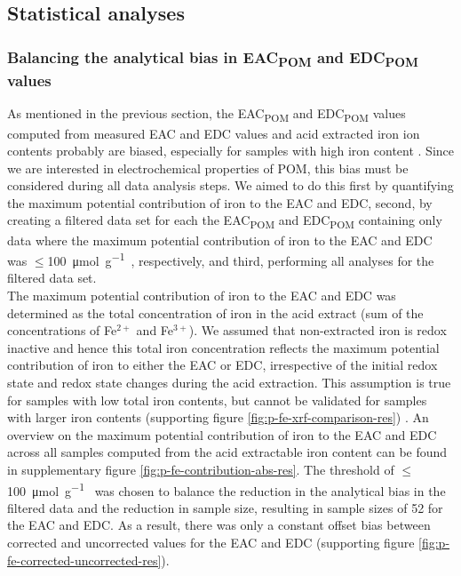 \documentclass[alpha-refs, lineno]{wiley-article-rmd}
\begin{document}
\hypertarget{statistical-analyses}{%
\subsection{Statistical analyses}\label{statistical-analyses}}

\hypertarget{balancing-the-analytical-bias-in-eac-and-edc-values}{%
\subsubsection{\texorpdfstring{Balancing the analytical bias in EAC\textsubscript{POM} and EDC\textsubscript{POM} values}{Balancing the analytical bias in EAC and EDC values}}\label{balancing-the-analytical-bias-in-eac-and-edc-values}}

As mentioned in the previous section, the EAC\textsubscript{POM} and EDC\textsubscript{POM} values computed from measured EAC and EDC values and acid extracted iron ion contents probably are biased, especially for samples with high iron content \autocite{Lau.2015,Lau.2016}. Since we are interested in electrochemical properties of POM, this bias must be considered during all data analysis steps. We aimed to do this first by quantifying the maximum potential contribution of iron to the EAC and EDC, second, by creating a filtered data set for each the EAC\textsubscript{POM} and EDC\textsubscript{POM} containing only data where the maximum potential contribution of iron to the EAC and EDC was \(\le\)\SI{100}{\micro\mol\per\gram\carbon}, respectively, and third, performing all analyses for the filtered data set.\\
The maximum potential contribution of iron to the EAC and EDC was determined as the total concentration of iron in the acid extract (sum of the concentrations of Fe\(^{2+}\) and Fe\(^{3+}\)). We assumed that non-extracted iron is redox inactive and hence this total iron concentration reflects the maximum potential contribution of iron to either the EAC or EDC, irrespective of the initial redox state and redox state changes during the acid extraction. This assumption is true for samples with low total iron contents, but cannot be validated for samples with larger iron contents (supporting figure \ref{fig:p-fe-xrf-comparison-res}) \autocite{Lau.2016}. An overview on the maximum potential contribution of iron to the EAC and EDC across all samples computed from the acid extractable iron content can be found in supplementary figure \ref{fig:p-fe-contribution-abs-res}. The threshold of \(\le\)\SI{100}{\micro\mol\per\gram\carbon} was chosen to balance the reduction in the analytical bias in the filtered data and the reduction in sample size, resulting in sample sizes of 52 for the EAC and EDC. As a result, there was only a constant offset bias between corrected and uncorrected values for the EAC and EDC (supporting figure \ref{fig:p-fe-corrected-uncorrected-res}).\\
\end{document}
